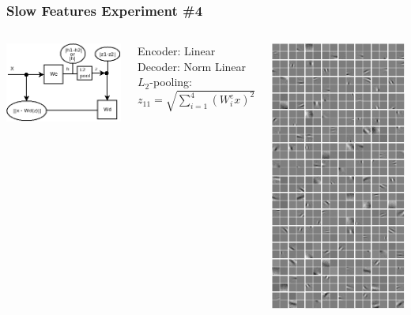 \documentclass{beamer}
\begin{document}
\begin{frame}
\frametitle{Slow Features Experiment \#4}    
\begin{columns}[c]
    \column{4cm}
            \includegraphics[scale=0.3]{./figures/sfa5.png} 
            \vspace{0.1cm}
             \begin{tiny}
			 Encoder: Linear \\
			 Decoder: Norm Linear \\
			 $L_2$-pooling: $z_{11} = \sqrt{\sum_{i=1} ^4 (W^e_i x)^2}$
			\end{tiny}
    \column{4cm}
             \includegraphics[scale=0.3]{./figures/dec_pooling.png} 
\end{columns} 
\end{frame} 
\end{document}
